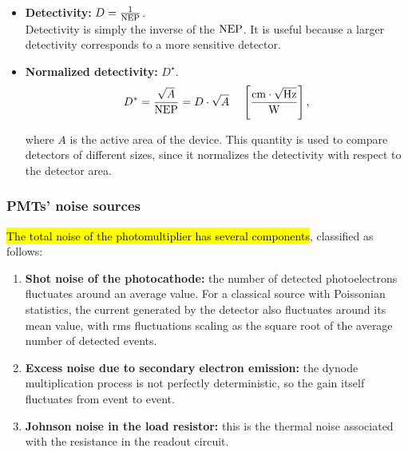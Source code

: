 \begin{itemize}
    \item \textbf{Detectivity:} $D = \frac{1}{\mathrm{NEP}}$.\\
    Detectivity is simply the inverse of the $\mathrm{NEP}$. It is useful because a larger detectivity corresponds to a more sensitive detector.

    \item \textbf{Normalized detectivity:} $D^\star$.
    \begin{equation}\label{eqn:8-photomultiplier-normalized-detectivity}
    D^* = \frac{\sqrt{A}}{\mathrm{NEP}} = D\cdot \sqrt{A}
    \hspace{0.4cm}
    \left[\frac{\mathrm{cm}\cdot \sqrt{\mathrm{Hz}}}{\mathrm{W}}\right],
    \end{equation}

    where $A$ is the active area of the device. This quantity is used to compare detectors of different sizes, since it normalizes the detectivity with respect to the detector area.
\end{itemize}


\subsubsection{PMTs' noise sources}
\hl{The total noise of the photomultiplier has several components}, classified as follows:
\begin{enumerate}
    \item \textbf{Shot noise of the photocathode:} the number of detected photoelectrons fluctuates around an average value. For a classical source with Poissonian statistics, the current generated by the detector also fluctuates around its mean value, with rms fluctuations scaling as the square root of the average number of detected events.

    \item \textbf{Excess noise due to secondary electron emission:} the dynode multiplication process is not perfectly deterministic, so the gain itself fluctuates from event to event.

    \item \textbf{Johnson noise in the load resistor:} this is the thermal noise associated with the resistance in the readout circuit.
\end{enumerate}

